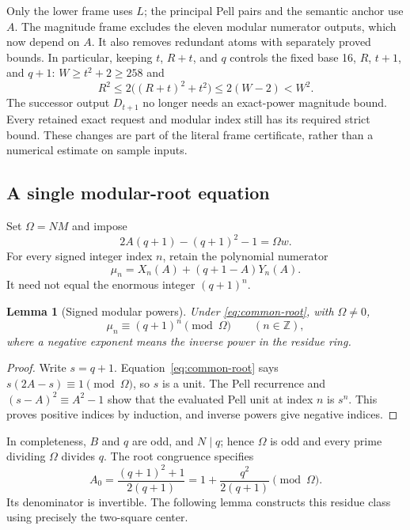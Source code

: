 \documentclass[11pt]{article}
\newtheorem{lemma}[theorem]{Lemma}
\theoremstyle{remark}\newtheorem{remark}[theorem]{Remark}
\newcommand{\Z}{\mathbb Z}\newcommand{\N}{\mathbb N}
\begin{document}
Only the lower frame uses $L$; the principal Pell pairs and the
semantic anchor use $A$. The magnitude frame excludes the eleven
modular numerator outputs, which now depend on $A$. It also removes
redundant atoms with separately proved bounds. In particular, keeping
$t$, $R+t$, and $q$ controls the fixed base 16, $R$, $t+1$, and $q+1$:
$W\ge t^2+2\ge258$ and
\[
 R^2\le2\bigl((R+t)^2+t^2\bigr)\le2(W-2)<W^2.
\]
The successor output $D_{t+1}$ no longer needs an exact-power magnitude
bound. Every retained exact request and modular index still has its
required strict bound. These changes are part of the literal frame
certificate, rather than a numerical estimate on sample inputs.

\subsection{A single modular-root equation}

Set $\Omega=NM$ and impose
\begin{equation}\label{eq:common-root}
 2A(q+1)-(q+1)^2-1=\Omega w.
\end{equation}
For every signed integer index $n$, retain the polynomial numerator
\begin{equation}\label{eq:mu}
 \mu_n=X_n(A)+(q+1-A)Y_n(A).
\end{equation}
It need not equal the enormous integer $(q+1)^n$.

\begin{lemma}[Signed modular powers]\label{lem:modular}
Under \eqref{eq:common-root}, with $\Omega\ne0$,
\[
 \mu_n\equiv(q+1)^n\pmod\Omega\qquad(n\in\Z),
\]
where a negative exponent means the inverse power in the residue ring.
\end{lemma}
\begin{proof}
Write $s=q+1$. Equation~\eqref{eq:common-root} says
$s(2A-s)\equiv1\pmod\Omega$, so $s$ is a unit. The Pell
recurrence and $(s-A)^2\equiv A^2-1$ show that the evaluated Pell
unit at index $n$ is $s^n$. This proves positive indices by induction,
and inverse powers give negative indices.
\end{proof}

In completeness, $B$ and $q$ are odd, and $N\mid q$; hence
$\Omega$ is odd and every prime dividing $\Omega$ divides $q$.
The root congruence specifies
\[
 A_0=\frac{(q+1)^2+1}{2(q+1)}
    =1+\frac{q^2}{2(q+1)}\pmod\Omega.
\]
Its denominator is invertible. The following lemma constructs this
residue class using precisely the two-square center.
\end{document}
